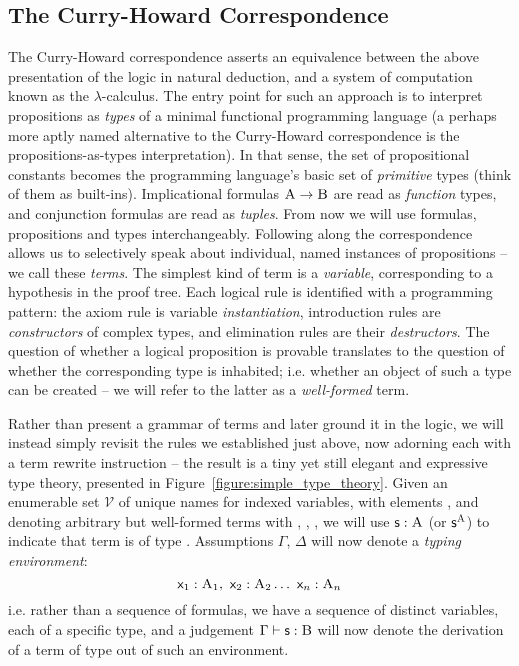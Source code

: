 \subsection{The Curry-Howard Correspondence}
The Curry-Howard correspondence asserts an equivalence between the above presentation of the logic in natural deduction, and a system of computation known as the $\lambda$-calculus.
The entry point for such an approach is to interpret propositions as \textit{types} of a minimal functional programming language (a perhaps more aptly named alternative to the Curry-Howard correspondence is the propositions-as-types interpretation).
In that sense, the set of propositional constants \propcon{} becomes the programming language's basic set of \textit{primitive} types (think of them as built-ins).
Implicational formulas $\prop A \to \prop B$ are read as \textit{function} types, and conjunction formulas are read as \textit{tuples}.
From now we will use formulas, propositions and types interchangeably.
Following along the correspondence allows us to selectively speak about individual, named instances of propositions -- we call these \textit{terms}.
The simplest kind of term is a \textit{variable}, corresponding to a hypothesis in the proof tree.
Each logical rule is identified with a programming pattern: the axiom rule is variable \textit{instantiation}, introduction rules are \textit{constructors} of complex types, and elimination rules are their \textit{destructors}.
The question of whether a logical proposition is provable translates to the question of whether the corresponding type is inhabited; i.e. whether an object of such a type can be created -- we will refer to the latter as a \textit{well-formed} term.

Rather than present a grammar of terms and later ground it in the logic, we will instead simply revisit the rules we established just above, now adorning each with a term rewrite instruction -- the result is a tiny yet still elegant and expressive type theory, presented in Figure~\ref{figure:simple_type_theory}.
Given an enumerable set $\mathcal{V}$ of unique names for indexed variables, with elements , and denoting arbitrary but well-formed terms with , , , we will use $\term{s}: \prop{A}$ (or $\term{s}^{\prop{A}}$) to indicate that term  is of type .
Assumptions $\Gamma$, $\Delta$ will now denote a \textit{typing environment}:
\[
\term x_1 : \prop  A_1 ,~ \term x_2 : \prop A_2 \dots ~ \term x_n : \prop A_n
\]
i.e. rather than a sequence of formulas, we have a sequence of distinct variables, each of a specific type, and a judgement $\Gamma \vdash \term{s} : \prop{B}$ will now denote the derivation of a term  of type  out of such an environment.

